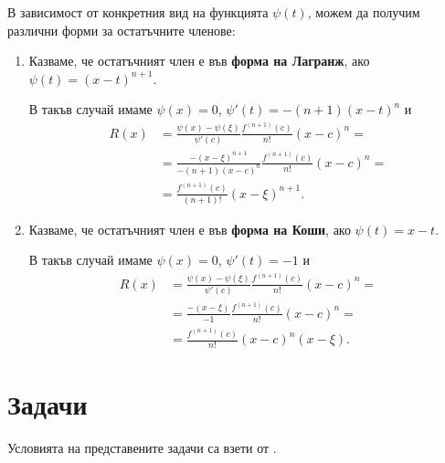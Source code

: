 \documentclass[
  headings=standardclasses,
  bibliography=totocnumbered,
]{scrartcl}
\begin{document}
В зависимост от конкретния вид на функцията \( \psi(t) \), можем да получим различни форми за остатъчните членове:
\begin{enumerate}
  \item Казваме, че остатъчният член е във \textbf{форма на Лагранж}, ако \( \psi(t) = {(x-t)}^{n+1} \).

  В такъв случай имаме \( \psi(x) = 0 \), \( \psi'(t) = -(n+1) {(x-t)}^n \) и
  \begin{align*}
    R(x)
    &=
    \frac {\psi(x) - \psi(\xi)} {\psi'(c)} \frac {f^{(n+1)}(c)} {n!} {(x-c)}^n
    = \\ &=
    \frac {-{(x-\xi)}^{n+1}} {-(n+1) {(x-c)}^n} \frac {f^{(n+1)}(c)} {n!} {(x-c)}^n
    = \\ &=
    \boxed{\frac {f^{(n+1)}(c)} {(n+1)!} {(x-\xi)}^{n+1}}.
  \end{align*}

  \item Казваме, че остатъчният член е във \textbf{форма на Коши}, ако \( \psi(t) = x-t \).

  В такъв случай имаме \( \psi(x) = 0 \), \( \psi'(t) = -1 \) и
  \begin{align*}
    R(x)
    &=
    \frac {\psi(x) - \psi(\xi)} {\psi'(c)} \frac {f^{(n+1)}(c)} {n!} {(x-c)}^n
    = \\ &=
    \frac {-(x-\xi)} {-1} \frac {f^{(n+1)}(c)} {n!} {(x-c)}^n
    = \\ &=
    \boxed{\frac {f^{(n+1)}(c)} {n!} {(x-c)}^n {(x-\xi)}}.
  \end{align*}
\end{enumerate}

\section{Задачи}

Условията на представените задачи са взети от \cite{Syllabus}.
\end{document}
